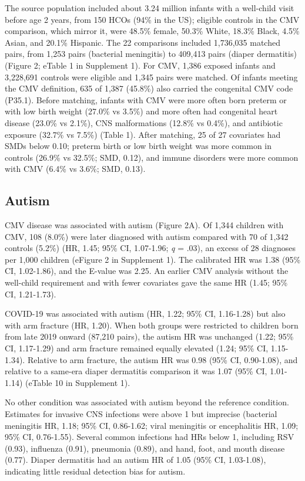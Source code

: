 \documentclass[11pt]{article}
\begin{document}
The source population included about 3.24 million infants with a well-child visit before age 2 years, from 150 HCOs (94\% in the US); eligible controls in the CMV comparison, which mirror it, were
48.5\% female, 50.3\% White, 18.3\% Black, 4.5\% Asian, and 20.1\% Hispanic. The 22 comparisons included 1,736,035 matched pairs, from 1,253 pairs (bacterial meningitis) to 409,413 pairs (diaper
dermatitis) (Figure 2; eTable 1 in Supplement 1). For CMV, 1,386 exposed infants and 3,228,691 controls were eligible and 1,345 pairs were matched. Of infants meeting the CMV definition, 635 of 1,387
(45.8\%) also carried the congenital CMV code (P35.1). Before matching, infants with CMV were more often born preterm or with low birth weight (27.0\% vs 3.5\%) and more often had congenital heart
disease (23.0\% vs 2.1\%), CNS malformations (12.8\% vs 0.4\%), and antibiotic exposure (32.7\% vs 7.5\%) (Table 1). After matching, 25 of 27 covariates had SMDs below 0.10; preterm birth or low birth
weight was more common in controls (26.9\% vs 32.5\%; SMD, 0.12), and immune disorders were more common with CMV (6.4\% vs 3.6\%; SMD, 0.13).

\hypertarget{autism}{%
\subsection*{Autism}\label{autism}}

CMV disease was associated with autism (Figure 2A). Of 1,344 children with CMV, 108 (8.0\%) were later diagnosed with autism compared with 70 of 1,342 controls (5.2\%) (HR, 1.45; 95\% CI, 1.07-1.96;
\emph{q} = .03), an excess of 28 diagnoses per 1,000 children (eFigure 2 in Supplement 1). The calibrated HR was 1.38 (95\% CI, 1.02-1.86), and the E-value was 2.25. An earlier CMV analysis without
the well-child requirement and with fewer covariates gave the same HR (1.45; 95\% CI, 1.21-1.73).

COVID-19 was associated with autism (HR, 1.22; 95\% CI, 1.16-1.28) but also with arm fracture (HR, 1.20). When both groups were restricted to children born from late 2019 onward (87,210 pairs), the
autism HR was unchanged (1.22; 95\% CI, 1.17-1.29) and arm fracture remained equally elevated (1.24; 95\% CI, 1.15-1.34). Relative to arm fracture, the autism HR was 0.98 (95\% CI, 0.90-1.08), and
relative to a same-era diaper dermatitis comparison it was 1.07 (95\% CI, 1.01-1.14) (eTable 10 in Supplement 1).

No other condition was associated with autism beyond the reference condition. Estimates for invasive CNS infections were above 1 but imprecise (bacterial meningitis HR, 1.18; 95\% CI, 0.86-1.62; viral
meningitis or encephalitis HR, 1.09; 95\% CI, 0.76-1.55). Several common infections had HRs below 1, including RSV (0.93), influenza (0.91), pneumonia (0.89), and hand, foot, and mouth disease (0.77).
Diaper dermatitis had an autism HR of 1.05 (95\% CI, 1.03-1.08), indicating little residual detection bias for autism.
\end{document}
